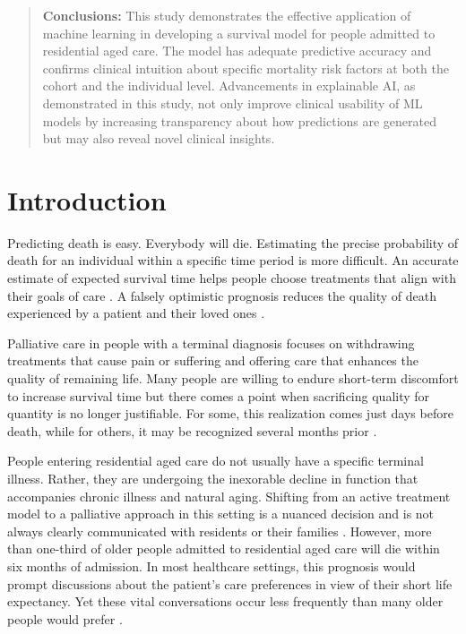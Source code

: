 \documentclass{article}
\begin{document}
\begin{abstract}
\textbf{Conclusions:} This study demonstrates the effective application of machine learning in developing a survival model for people admitted to residential aged care. The model has adequate predictive accuracy and confirms clinical intuition about specific mortality risk factors at both the cohort and the individual level.  Advancements in explainable AI, as demonstrated in this study, not only improve clinical usability of ML models by increasing transparency about how predictions are generated but may also reveal novel clinical insights.


\end{abstract}





\section{Introduction}
Predicting death is easy. Everybody will die. Estimating the precise probability of death for an individual within a specific time period is more difficult.   An accurate estimate of expected survival time helps people choose treatments that align with their goals of care \cite{weeks1998relationship}.  A falsely optimistic prognosis reduces the quality of death experienced by a patient and their loved ones \cite{christakis2000extent}.

Palliative care in people with a terminal diagnosis focuses on withdrawing treatments that cause pain or suffering and offering care that enhances the quality of remaining life. Many people are willing to endure short-term discomfort to increase survival time but there comes a point when sacrificing quality for quantity is no longer justifiable. For some, this realization comes just days before death, while for others, it may be recognized several months prior \cite{wright2008associations}.

People entering residential aged care do not usually have a specific terminal illness.  Rather, they are undergoing the inexorable decline in function that accompanies chronic illness and natural aging\cite{luppa2010prediction}. Shifting from an active treatment model to a palliative approach in this setting is a nuanced decision and is not always clearly communicated with residents or their families \cite{omori2022language}. However, more than one-third of older people admitted to residential aged care will die within six months of admission\cite{kelly2010length}. In most healthcare settings, this prognosis would prompt discussions about the patient’s care preferences in view of their short life expectancy. Yet these vital conversations occur less frequently than many older people would prefer \cite{sharp2013elderly}.
\end{document}
